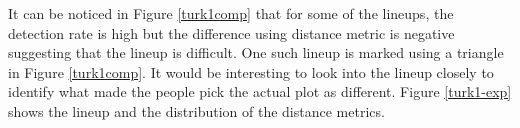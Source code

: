 \documentclass[12]{article}
\begin{document}
It can be noticed in Figure \ref{turk1comp} that for some of the lineups, the detection rate is high but the difference using distance metric is negative suggesting that the lineup is difficult. One such lineup is marked using a triangle in Figure \ref{turk1comp}. It would be interesting to look into the lineup closely to identify what made the people pick the actual plot as different. Figure \ref{turk1-exp} shows the lineup and the distribution of the distance metrics. 

\begin{figure}[hbtp]
\centering
{}
\end{figure}
\end{document}
